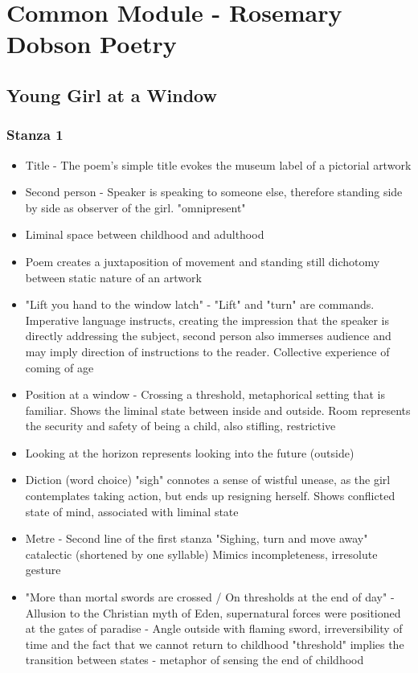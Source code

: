 
\chapter{Common Module - Rosemary Dobson Poetry}

\section{Young Girl at a Window} \label{1/11/2024}
	\subsection{Stanza 1}
		\begin{itemize}
			\item Title - The poem's simple title evokes the museum label of a pictorial artwork
			\item Second person - Speaker is speaking to someone else, therefore standing side by side as observer of the girl. "omnipresent"
			\item Liminal space between childhood and adulthood
			\item Poem creates a juxtaposition of movement and standing still
				\subitem dichotomy between static nature of an artwork
			\item "Lift you hand to the window latch" - "Lift" and "turn" are commands. Imperative language instructs, creating the impression that the speaker is directly addressing the subject, second person also immerses audience and may imply direction of instructions to the reader. Collective experience of coming of age
			\item Position at a window - Crossing a threshold, metaphorical setting that is familiar. Shows the liminal state between inside and outside. Room represents the security and safety of being a child, also stifling, restrictive
			\item Looking at the horizon represents looking into the future (outside)
			\item Diction (word choice) "sigh" connotes a sense of wistful unease, as the girl contemplates taking action, but ends up resigning herself. Shows conflicted state of mind, associated with liminal state
			\item Metre - Second line of the first stanza "Sighing, turn and move away" catalectic (shortened by one syllable) Mimics incompleteness, irresolute gesture
			\item "More than mortal swords are crossed / On thresholds at the end of day" - Allusion to the Christian myth of Eden, supernatural forces were positioned at the gates of paradise - Angle outside with flaming sword, irreversibility of time and the fact that we cannot return to childhood "threshold" implies the transition between states - metaphor of sensing the end of childhood

\end{itemize}
